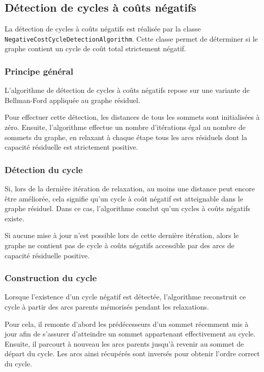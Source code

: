 \documentclass[titlepage]{article}
\begin{document}
\clearpage


\subsection{Détection de cycles à coûts négatifs}

La détection de cycles à coûts négatifs est réalisée par la classe \texttt{NegativeCostCycleDetectionAlgorithm}. Cette classe permet de déterminer si le graphe contient un cycle de coût total strictement négatif.

\subsubsection{Principe général}

L'algorithme de détection de cycles à coûts négatifs repose sur une variante de Bellman-Ford appliquée au graphe résiduel.

Pour effectuer cette détection, les distances de tous les sommets sont initialisées à zéro. Ensuite, l'algorithme effectue un nombre d'itérations égal au nombre de sommets du graphe, en relaxant à chaque étape tous les arcs résiduels dont la capacité résiduelle est strictement positive.

\subsubsection{Détection du cycle}

Si, lors de la dernière itération de relaxation, au moins une distance peut encore être améliorée, cela signifie qu'un cycle à coût négatif est atteignable dans le graphe résiduel. Dans ce cas, l'algorithme conclut qu'un cycles à coûts négatifs existe.

Si aucune mise à jour n'est possible lors de cette dernière itération, alors le graphe ne contient pas de cycle à coûts négatifs accessible par des arcs de capacité résiduelle positive.

\subsubsection{Construction du cycle}

Lorsque l'existence d'un cycle négatif est détectée, l'algorithme reconstruit ce cycle à partir des arcs parents mémorisés pendant les relaxations.

Pour cela, il remonte d'abord les prédécesseurs d'un sommet récemment mis à jour afin de s'assurer d'atteindre un sommet appartenant effectivement au cycle. Ensuite, il parcourt à nouveau les arcs parents jusqu'à revenir au sommet de départ du cycle. Les arcs ainsi récupérés sont inversés pour obtenir l'ordre correct du cycle.
\end{document}
